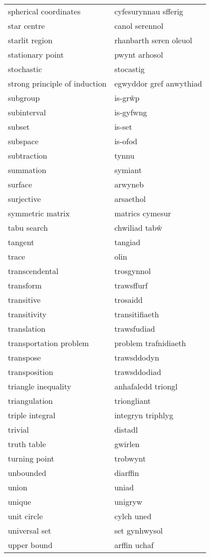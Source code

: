\begin{supertabular}{p{0.22\textwidth}p{0.22\textwidth}}
spherical coordinates & cyfesurynnau sfferig \\
star centre & canol serennol \\
starlit region & rhanbarth seren oleuol \\
stationary point & pwynt arhosol \\
stochastic & stocastig \\
strong principle of induction & egwyddor gref anwythiad \\
subgroup & is-grŵp \\
subinterval & is-gyfwng \\
subset & is-set \\
subspace & is-ofod \\
subtraction & tynnu \\
summation & symiant \\
surface & arwyneb \\
surjective & arsaethol \\
symmetric matrix & matrics cymesur \\
tabu search & chwiliad tabŵ \\
tangent & tangiad \\
trace & olin \\
transcendental & trosgynnol \\
transform & trawsffurf \\
transitive & trosaidd \\
transitivity & transitifiaeth \\
translation & trawsfudiad \\
transportation problem & problem trafnidiaeth \\
transpose & trawsddodyn \\
transposition & trawsddodiad \\
triangle inequality & anhafaledd triongl \\
triangulation & triongliant \\
triple integral & integryn triphlyg \\
trivial & distadl \\
truth table & gwirlen \\
turning point & trobwynt \\
unbounded & diarffin \\
union & uniad \\
unique & unigryw \\
unit circle & cylch uned \\
universal set & set gynhwysol \\
upper bound & arffin uchaf \\

\end{supertabular}
